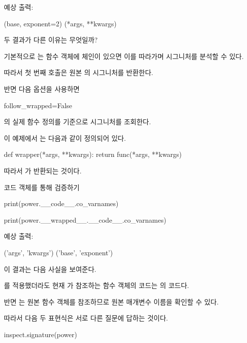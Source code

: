 예상 출력:

\begin{dhkzsh}
(base, exponent=2)
(*args, **kwargs)
\end{dhkzsh}

두 결과가 다른 이유는 무엇일까?

기본적으로 는 함수 객체에  체인이 있으면 이를 따라가며 시그니처를 분석할 수 있다.

따라서 첫 번째 호출은 원본 의 시그니처를 반환한다.

반면 다음 옵션을 사용하면

\begin{dhkcode}
follow_wrapped=False
\end{dhkcode}

의 실제 함수 정의를 기준으로 시그니처를 조회한다.

이 예제에서 는 다음과 같이 정의되어 있다.

\begin{dhkcode}
def wrapper(*args, **kwargs):
    return func(*args, **kwargs)
\end{dhkcode}

따라서 가 반환되는 것이다.

\begin{dhknote}
\begin{dhksmry}[centered]
코드 객체를 통해 검증하기
\end{dhksmry}
\end{dhknote}

\begin{dhkcode}
print(power.__code__.co_varnames)

print(power.__wrapped__.__code__.co_varnames)
\end{dhkcode}

예상 출력:

\begin{dhkzsh}
('args', 'kwargs')
('base', 'exponent')
\end{dhkzsh}

이 결과는 다음 사실을 보여준다.

를 적용했더라도 현재 가 참조하는 함수 객체의 코드는 의 코드다.

반면 는 원본 함수 객체를 참조하므로 원본 매개변수 이름을 확인할 수 있다.

따라서 다음 두 표현식은 서로 다른 질문에 답하는 것이다.

\begin{dhkcode}
inspect.signature(power)
\end{dhkcode}

